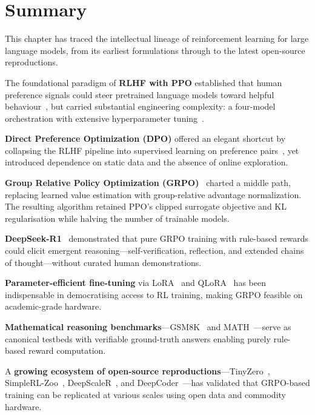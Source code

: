 \documentclass[12pt,a4paper]{report}
\begin{document}
\section{Summary}
\label{sec:lit-summary}

This chapter has traced the intellectual lineage of reinforcement learning for large language models, from its earliest formulations through to the latest open-source reproductions.

The foundational paradigm of \textbf{RLHF with PPO} established that human preference signals could steer pretrained language models toward helpful behaviour~\cite{ouyang2022instructgpt}, but carried substantial engineering complexity: a four-model orchestration with extensive hyperparameter tuning~\cite{schulman2017ppo, zheng2023secrets}.

\textbf{Direct Preference Optimization (DPO)} offered an elegant shortcut by collapsing the RLHF pipeline into supervised learning on preference pairs~\cite{rafailov2023dpo}, yet introduced dependence on static data and the absence of online exploration.

\textbf{Group Relative Policy Optimization (GRPO)}~\cite{shao2024deepseekmath} charted a middle path, replacing learned value estimation with group-relative advantage normalization. The resulting algorithm retained PPO's clipped surrogate objective and KL regularisation while halving the number of trainable models.

\textbf{DeepSeek-R1}~\cite{deepseek2025r1} demonstrated that pure GRPO training with rule-based rewards could elicit emergent reasoning---self-verification, reflection, and extended chains of thought---without curated human demonstrations.

\textbf{Parameter-efficient fine-tuning} via LoRA~\cite{hu2021lora} and QLoRA~\cite{dettmers2023qlora} has been indispensable in democratising access to RL training, making GRPO feasible on academic-grade hardware.

\textbf{Mathematical reasoning benchmarks}---GSM8K~\cite{cobbe2021gsm8k} and MATH~\cite{hendrycks2021math}---serve as canonical testbeds with verifiable ground-truth answers enabling purely rule-based reward computation.

A \textbf{growing ecosystem of open-source reproductions}---TinyZero~\cite{wen2025tinyzero}, SimpleRL-Zoo~\cite{zeng2025simplerl}, DeepScaleR~\cite{luo2025deepscaler}, and DeepCoder~\cite{xu2025deepcoder}---has validated that GRPO-based training can be replicated at various scales using open data and commodity hardware.
\end{document}
